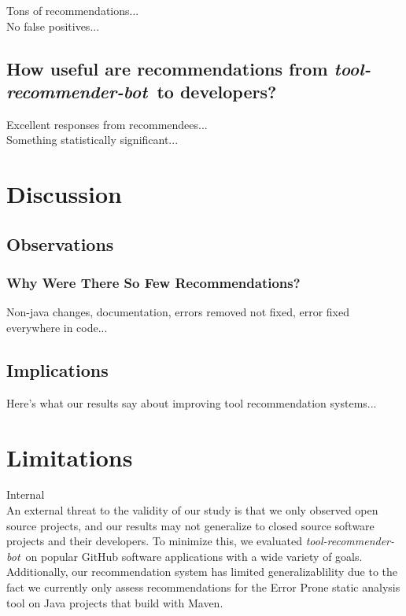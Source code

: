 \documentclass[sigconf,review,anonymous]{acmart}
\newcommand{\tool}{\textsl{tool-recommender-bot}}
\begin{document}
Tons of recommendations... \\

No false positives...

\subsection{How useful are recommendations from \tool~to developers?}

Excellent responses from recommendees...\\

Something statistically significant...

\section{Discussion}

\subsection{Observations}

\subsubsection{Why Were There So Few Recommendations?}

Non-java changes, documentation, errors removed not fixed, error fixed everywhere in code...

\subsection{Implications}

Here's what our results say about improving tool recommendation systems...

\section{Limitations}

Internal\\

An external threat to the validity of our study is that we only observed open source projects, and our results may not generalize to closed source software projects and their developers. To minimize this, we evaluated \tool~on popular GitHub software applications with a wide variety of goals. Additionally, our recommendation system has limited generalizablility due to the fact we currently only assess recommendations for the Error Prone static analysis tool on Java projects that build with Maven.
\end{document}

